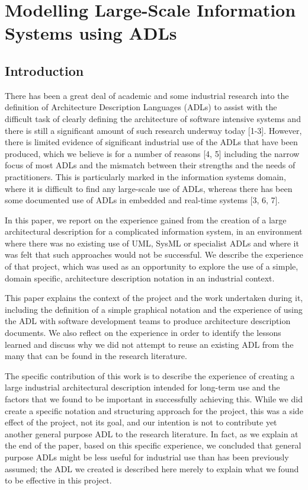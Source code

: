 \chapter{Modelling Large-Scale Information Systems using ADLs}

\section{Introduction}

  There has been a great deal of academic and some industrial research into the definition of Architecture Description Languages (ADLs) to assist with the difficult task of clearly defining the architecture of software intensive systems and there is still a significant amount of such research underway today [1-3].  However, there is limited evidence of significant industrial use of the ADLs that have been produced, which we believe is for a number of reasons [4, 5] including the narrow focus of most ADLs and the mismatch between their strengths and the needs of practitioners.  This is particularly marked in the information systems domain, where it is difficult to find any large-scale use of ADLs, whereas there has been some documented use of ADLs in embedded and real-time systems [3, 6, 7].

  In this paper, we report on the experience gained from the creation of a large architectural description for a complicated information system, in an environment where there was no existing use of UML, SysML or specialist ADLs and where it was felt that such approaches would not be successful.  We describe the experience of that project, which was used as an opportunity to explore the use of a simple, domain specific, architecture description notation in an industrial context.

  This paper explains the context of the project and the work undertaken during it, including the definition of a simple graphical notation and the experience of using the ADL with software development teams to produce architecture description documents.  We also reflect on the experience in order to identify the lessons learned and discuss why we did not attempt to reuse an existing ADL from the many that can be found in the research literature.

  The specific contribution of this work is to describe the experience of creating a large industrial architectural description intended for long-term use and the factors that we found to be important in successfully achieving this.  While we did create a specific notation and structuring approach for the project, this was a side effect of the project, not its goal, and our intention is not to contribute yet another general purpose ADL to the research literature.  In fact, as we explain at the end of the paper, based on this specific experience, we concluded that general purpose ADLs might be less useful for industrial use than has been previously assumed; the ADL we created is described here merely to explain what we found to be effective in this project.

